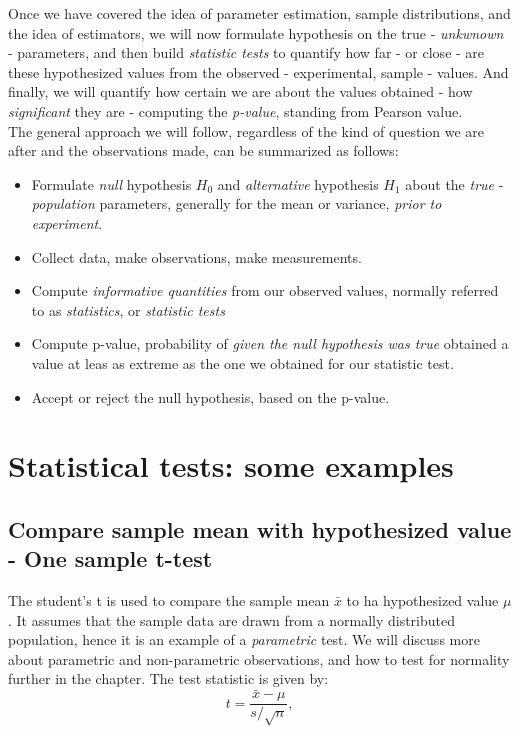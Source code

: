 \documentclass{book}
\begin{document}
Once we have covered the idea of parameter estimation, sample distributions, and the idea of estimators, we will now formulate hypothesis on the true - \textit{unkwnown} - parameters, and then build \textit{statistic tests} to quantify how far - or close - are these hypothesized values from the observed - experimental, sample - values. And finally, we will quantify how certain we are about the values obtained - how \textit{significant} they are - computing the \textit{p-value}, standing from Pearson value.\\ The general approach we will follow, regardless of the kind of question we are after and the observations made, can be summarized as follows:

\begin{itemize}
\item Formulate \textit{null} hypothesis $H_0$ and \textit{alternative} hypothesis $H_1$ about the \textit{true} - \textit{population} parameters, generally for the mean or variance, \textit{prior to experiment}.
\item Collect data, make observations, make measurements.
\item Compute \textit{informative quantities} from our observed values, normally referred to as \textit{statistics}, or \textit{statistic tests}
\item Compute p-value, probability of \textit{given the null hypothesis was true} obtained a value at leas as extreme as the one we obtained for our statistic test.
\item Accept or reject the null hypothesis, based on the p-value.
\end{itemize}

\newpage

\section{Statistical tests: some examples}

\subsection{Compare sample mean with hypothesized value - One sample t-test}

The student's t is used to compare the sample mean $\bar{x}$ to ha hypothesized value $\mu$. It assumes that the sample data are drawn from a normally distributed population, hence it is an example of a \textit{parametric} test. We will discuss more about parametric and non-parametric observations, and how to test for normality further in the chapter. The test statistic is given by:
\[
    t = \frac{\bar{x} - \mu}{s / \sqrt{n}},
\]
\end{document}
